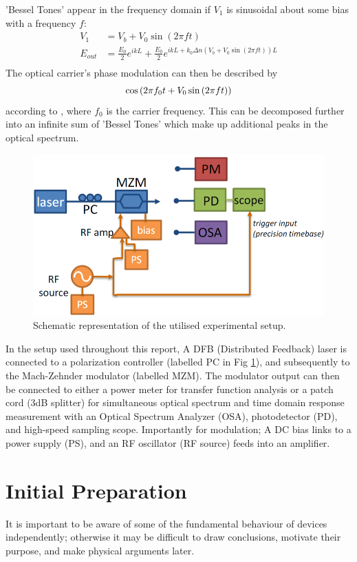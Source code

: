 \documentclass[12pt,a4paper]{report}
\newcommand{\mychapter}[2]{
    \vspace{-1.5cm}
    \setcounter{chapter}{#1}
    \setcounter{section}{0}
    \chapter*{#2}
    \addcontentsline{toc}{chapter}{#2}
    \vspace{-1.25cm}
}
\begin{document}
'Bessel Tones' appear in the frequency domain if $V_1$ is sinusoidal about some bias with a frequency $f$:
\begin{align*}
    V_1 &= V_b + V_0\sin{(2\pi{}ft)}\\
    E_{out} &= \frac{E_0}{2}e^{ikL} + \frac{E_0}{2}e^{ikL + k_0 \Delta n(V_b + V_0\sin{(2\pi{}ft)})L}\\
\end{align*}
The optical carrier's phase modulation can then be described by
\begin{equation}
    \cos{(2\pi{}f_0t+V_0\sin{(2\pi{}ft)})}
    \notag
\end{equation}
according to \cite{freq}, where $f_0$ is the carrier frequency. This can be decomposed further into an infinite sum of 'Bessel Tones' which make up additional peaks in the optical spectrum.
\begin{figure}
\centering
\includegraphics[width=0.7\columnwidth]{Fig-setup.png} 
\caption{Schematic representation of the utilised experimental setup. \cite{lab_brief}}
\label{fig-setup}
\end{figure}
\vspace{-0.5cm}
In the setup used throughout this report, A DFB (Distributed Feedback) laser is connected to a polarization controller (labelled PC in Fig \ref{fig-setup}), and subsequently to the Mach-Zehnder modulator (labelled MZM). The modulator output can then be connected to either a power meter for transfer function analysis or a patch cord (3dB splitter) for simultaneous optical spectrum and time domain response measurement with an Optical Spectrum Analyzer (OSA), photodetector (PD), and high-speed sampling scope. Importantly for modulation; A DC bias links to a power supply (PS), and an RF oscillator (RF source) feeds into an amplifier. 

\mychapter{2}{Initial Preparation}

It is important to be aware of some of the fundamental behaviour of devices independently; otherwise it may be difficult to draw conclusions, motivate their purpose, and make physical arguments later.
\end{document}
